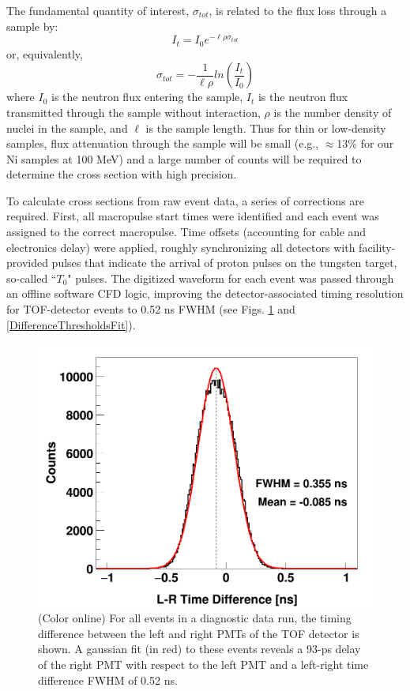 \documentclass[twocolumn,secnumarabic,amssymb, nobibnotes, aps, prl,
superscriptaddress, nobalancelastpage]{revtex4}
\newcommand{\tot}{\ensuremath{\sigma_{tot}}}
\begin{document}
The fundamental quantity of interest, \tot, is related to the flux
loss through a sample by:
\begin{equation}
I_{t} = I_{0}e^{-{\ell\rho\sigma_{tot}}}
\end{equation}
or, equivalently,
\begin{equation}
    \tot = -\frac{1}{\ell\rho}ln\left(\frac{I_{t}}{I_{0}}\right)
\end{equation}
where $I_{0}$ is the neutron flux entering the sample, $I_{t}$ is the neutron
flux transmitted through the sample without interaction, $\rho$ is the number
density of nuclei in the sample, and $\ell$ is the sample length. Thus for thin
or low-density samples, flux attenuation through the sample will be small
(e.g., $\approx$13\% for our Ni samples at 100 MeV) and a large number
of counts will be required to determine the cross section with high
precision.

To calculate cross sections from raw event data, a series of corrections are
required. First, all macropulse start times were identified and each event was
assigned to the correct macropulse. Time offsets (accounting for cable and
electronics delay) were applied, roughly synchronizing all detectors with
facility-provided pulses that indicate the arrival of proton pulses on the
tungsten target, so-called ``$T_{0}$" pulses. The digitized waveform for each event was passed 
through an offline software CFD logic, improving the detector-associated timing resolution 
for TOF-detector events to 0.52 ns FWHM (see Figs. \ref{LRTimeDifferenceLinear}
and \ref{DifferenceThresholdsFit}).

\begin{figure}
    \includegraphics[scale=0.3]{figures/Difference_Linear.png}
    \caption{(Color online) For all events in a diagnostic data run, the timing difference   
        between the left and right PMTs of the TOF detector is shown.
        A gaussian fit (in red) to these events reveals a 93-ps delay of the right PMT with 
    respect to the left PMT and a left-right time difference FWHM of 0.52 ns.}
    \label{LRTimeDifferenceLinear}
\end{figure}
\end{document}
